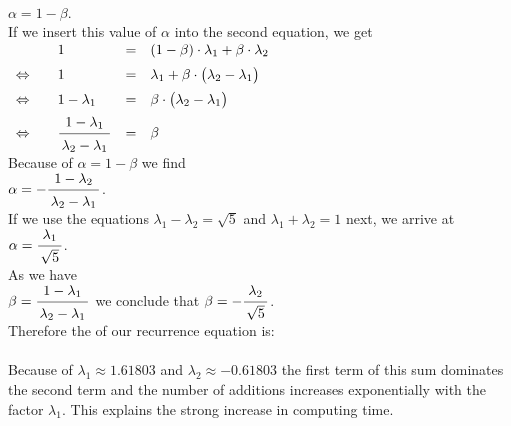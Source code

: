 \\[0.2cm]
\hspace*{1.3cm}
$\alpha = 1 - \beta$.
\\[0.2cm]
If we insert this value of $\alpha$  into the second equation, we get 
\\[0.2cm]
\hspace*{1.3cm}
$
\begin{array}{clcl}
                      &  1 & = & (1 - \beta)\cdot  \lambda_1 + \beta \cdot \lambda_2 \\[0.2cm]
\Leftrightarrow\quad  &  1 & = & 
 \lambda_1  + \beta \cdot \bigl( \lambda_2 - \lambda_1\bigr) \\[0.2cm]
\Leftrightarrow\quad  &  1 - \lambda_1 & = & \beta \cdot \bigl(\lambda_2 - \lambda_1\bigr)  \\[0.2cm]
\Leftrightarrow\quad  &  \bruch{1 - \lambda_1}{\lambda_2 - \lambda_1} & = & \beta 
\end{array}
$
\\[0.2cm]
Because of $\alpha = 1 - \beta$ we find  \\[0.2cm]
\hspace*{1.3cm} $\alpha = - \bruch{1 - \lambda_2}{\lambda_2 - \lambda_1}$. \\[0.2cm]
If we use the equations $\lambda_1 - \lambda_2 = \sqrt{5}$ and $\lambda_1 + \lambda_2 = 1$ next, we arrive at
\\[0.2cm]
\hspace*{1.3cm} 
$\alpha = \bruch{\lambda_1}{\sqrt{5}} $.
\\[0.2cm]
As we have
\\[0.2cm]
\hspace*{1.3cm}
$\beta =  \bruch{1 - \lambda_1}{\lambda_2 - \lambda_1}$ \quad 
we conclude that \quad
$\beta = -\bruch{\lambda_2}{\sqrt{5}}$. 
\\[0.2cm]
Therefore the  of our recurrence equation is: \\[0.2cm]
\hspace*{1.3cm}
  \colorbox{red}{}
\\[0.2cm]
Because of $\lambda_1\approx 1.61803$ and $\lambda_2 \approx - 0.61803$ the first term
of this sum dominates the second term and the number of additions increases exponentially with the factor $\lambda_1$.
This explains the strong increase in computing time.
\pagebreak

